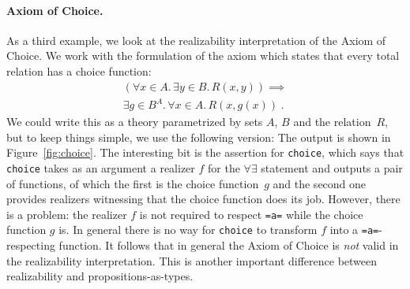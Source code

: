 \begin{figure*}
  \centering
  {\small{}}
  \caption{Output for theories \texttt{Iteration} and \texttt{Nat}}
  \label{fig:nat}
\end{figure*}


\paragraph{Axiom of Choice.}
\label{sec:axiom-choice}

As a third example, we look at the realizability interpretation of the
Axiom of Choice. We work with the formulation of the axiom which
states that every total relation has a choice function:
%
\begin{multline*}
  (\forall x \in A .\,
   \exists y \in B .\, R(x, y)) \implies \\
  \exists g \in B^A .\,
  \forall x \in A .\, R(x, g(x)) \;.
\end{multline*}
%
We could write this as a theory parametrized by sets $A$, $B$ and the
relation~$R$, but to keep things simple, we use the following version:
%
{\small{}}%
%
The output is shown in Figure~\ref{fig:choice}. The interesting bit is
the assertion for \Verb|choice|, which says that \Verb|choice| takes
as an argument a realizer $f$ for the $\forall\exists$ statement and
outputs a pair of functions, of which the first is the choice
function~$g$ and the second one provides realizers witnessing that the
choice function does its job. However, there is a problem: the
realizer $f$ is not required to respect \Verb|=a=| while the choice
function $g$ is. In general there is no way for \Verb|choice| to
transform $f$ into a \Verb|=a=|-respecting function. It follows that
in general the Axiom of Choice is \emph{not} valid in the
realizability interpretation. This is another important difference
between realizability and propositions-as-types.

\begin{figure*}
  \centering
  {\small {}}
  \caption{Output for theory \texttt{Choice}}
  \label{fig:choice}
\end{figure*}


